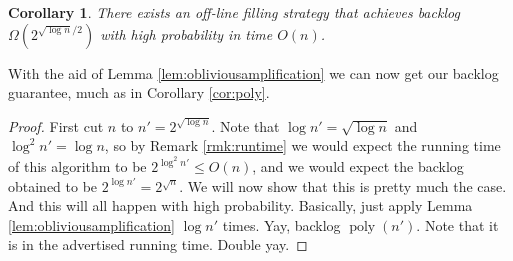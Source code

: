 \documentclass[twocolumn]{article}[11pt]
\DeclareMathOperator{\poly}{\text{poly}}
\newtheorem{corollary}{Corollary}
\begin{document}
\begin{corollary}
  \label{cor:randalmostpoly}
  There exists an off-line filling strategy that achieves backlog
  $\Omega(2^{\sqrt{\log n}/2})$ with high probability in time $O(n)$.
\end{corollary}

With the aid of Lemma \ref{lem:obliviousamplification} we can now get our
backlog guarantee, much as in Corollary \ref{cor:poly}.
\begin{proof}%
  First cut $n$ to $n' =2^{\sqrt{\log n}}$. Note that $\log n' = \sqrt{\log n}$
  and $\log^2 n' = \log n$, so by Remark \ref{rmk:runtime} we would expect the
  running time of this algorithm to be $2^{\log^2 n'} \le O(n)$, and we would
  expect the backlog obtained to be $2^{\log n'} = 2^{\sqrt{n}}$. We will now
  show that this is pretty much the case. And this will all happen with high
  probability.
  Basically, just apply Lemma \ref{lem:obliviousamplification} $\log n'$ times.
  Yay, backlog $\poly(n')$. Note that it is in the advertised running time.
  Double yay.
 
\end{proof}
\end{document}
